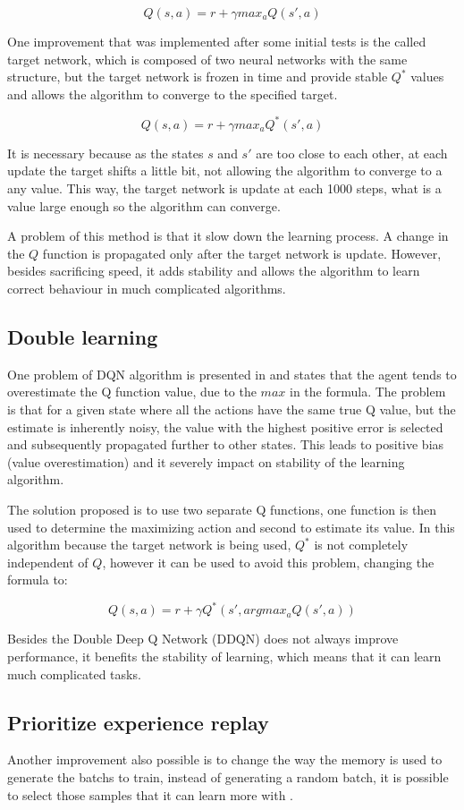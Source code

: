 \documentclass{article}
\newcommand{\targetUpdate}{1000}
\begin{document}
\[Q(s,a)=r+\gamma max_a Q(s',a)\]

One improvement that was implemented after some initial tests is the called target network, which is composed of two neural networks with the same structure, but the target network is frozen in time and provide stable $Q^*$ values and allows the algorithm to converge to the specified target.

\[Q(s,a)=r+\gamma max_a Q^*(s',a)\]

It is necessary because as the states $s$ and $s'$ are too close to each other, at each update the target shifts a little bit, not allowing the algorithm to converge to a any value. This way, the target network is update at each \targetUpdate{} steps, what is a value large enough so the algorithm can converge.

A problem of this method is that it slow down the learning process. A change in the $Q$ function is propagated only after the target network is update. However, besides sacrificing speed, it adds stability and allows the algorithm to learn correct behaviour in much complicated algorithms.

\subsection{Double learning}
One problem of DQN algorithm is presented in \cite{doubleQLearning} and states that the agent tends to overestimate the Q function value, due to the $max$ in the formula. The problem is that for a given state where all the actions have the same true Q value, but the estimate is inherently noisy, the value with the highest positive error is selected and subsequently propagated further to other states. This leads to positive bias (value overestimation) and it severely impact on stability of the learning algorithm.

The solution proposed is to use two separate Q functions, one function is then used to determine the maximizing action and second to estimate its value. In this algorithm because the target network is being used, $Q^*$ is not completely independent of $Q$, however it can be used to avoid this problem, changing the formula to:

\[Q(s,a)=r+\gamma Q^*(s', argmax_a Q(s',a))\]

Besides the Double Deep Q Network (DDQN) does not always improve performance, it benefits the stability of learning, which means that it can learn much complicated tasks.

\subsection{Prioritize experience replay}
Another improvement also possible is to change the way the memory is used to generate the batchs to train, instead of generating a random batch, it is possible to select those samples that it can learn more with \cite{prioritizedExperienceReplay}.
\end{document}
